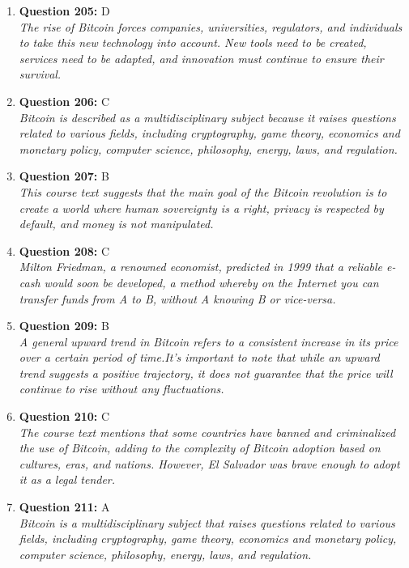 \documentclass[12pt,a4paper]{article}
\begin{document}
\begin{enumerate}
\item \textbf{Question 205:} D
\\ \textit{The rise of Bitcoin forces companies, universities, regulators, and individuals to take this new technology into account. New tools need to be created, services need to be adapted, and innovation must continue to ensure their survival.}

\item \textbf{Question 206:} C
\\ \textit{Bitcoin is described as a multidisciplinary subject because it raises questions related to various fields, including cryptography, game theory, economics and monetary policy, computer science, philosophy, energy, laws, and regulation.}

\item \textbf{Question 207:} B
\\ \textit{This course text suggests that the main goal of the Bitcoin revolution is to create a world where human sovereignty is a right, privacy is respected by default, and money is not manipulated.}

\item \textbf{Question 208:} C
\\ \textit{Milton Friedman, a renowned economist, predicted in 1999 that a reliable e-cash would soon be developed, a method whereby on the Internet you can transfer funds from A to B, without A knowing B or vice-versa.}

\item \textbf{Question 209:} B
\\ \textit{A general upward trend in Bitcoin refers to a consistent increase in its price over a certain period of time.It's important to note that while an upward trend suggests a positive trajectory, it does not guarantee that the price will continue to rise without any fluctuations.}

\item \textbf{Question 210:} C
\\ \textit{The course text mentions that some countries have banned and criminalized the use of Bitcoin, adding to the complexity of Bitcoin adoption based on cultures, eras, and nations. However, El Salvador was brave enough to adopt it as a legal tender.}

\item \textbf{Question 211:} A
\\ \textit{Bitcoin is a multidisciplinary subject that raises questions related to various fields, including cryptography, game theory, economics and monetary policy, computer science, philosophy, energy, laws, and regulation.}


\end{enumerate}
\end{document}
